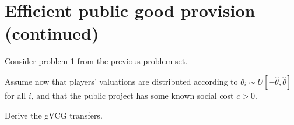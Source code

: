 \documentclass[a4paper]{article}
\begin{document}
%		
%		 
%		
%		



\section{Efficient public good provision (continued)}

Consider problem 1 from the previous problem set.

Assume now that players' valuations are distributed according to $\theta_i \sim U[-\hat{\theta},\hat{\theta}]$ for all $i$, and that the public project has some known social cost $c > 0$.

Derive the gVCG transfers.
\end{document}
